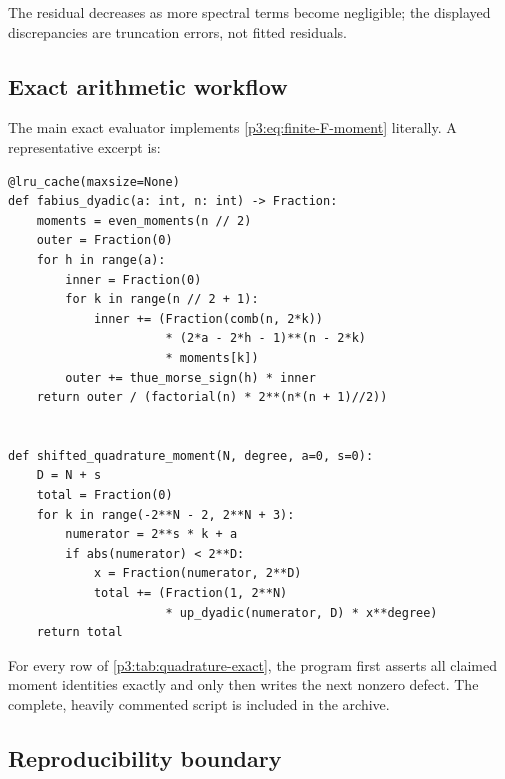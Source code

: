 \documentclass[11pt,oneside]{article}
\numberwithin{equation}{section}
\theoremstyle{definition}
\theoremstyle{remark}
\begin{document}
\begin{table}[H]
\centering
\caption{Independent exact-versus-spectral verification at $\theta=1/8$.  The first numerical column is obtained from exact rational arithmetic and displayed decimally; the full fractions are retained in the archive.}
\label{p3:tab:spectral-check}

\end{table}

The residual decreases as more spectral terms become negligible; the displayed discrepancies are truncation errors, not fitted residuals.

\subsection{Exact arithmetic workflow}

The main exact evaluator implements \eqref{p3:eq:finite-F-moment} literally.  A representative excerpt is:

\begin{lstlisting}[style=frontiercode,caption={Exact dyadic Fabius evaluation and shifted moment quadrature.}]
@lru_cache(maxsize=None)
def fabius_dyadic(a: int, n: int) -> Fraction:
    moments = even_moments(n // 2)
    outer = Fraction(0)
    for h in range(a):
        inner = Fraction(0)
        for k in range(n // 2 + 1):
            inner += (Fraction(comb(n, 2*k))
                      * (2*a - 2*h - 1)**(n - 2*k)
                      * moments[k])
        outer += thue_morse_sign(h) * inner
    return outer / (factorial(n) * 2**(n*(n + 1)//2))


def shifted_quadrature_moment(N, degree, a=0, s=0):
    D = N + s
    total = Fraction(0)
    for k in range(-2**N - 2, 2**N + 3):
        numerator = 2**s * k + a
        if abs(numerator) < 2**D:
            x = Fraction(numerator, 2**D)
            total += (Fraction(1, 2**N)
                      * up_dyadic(numerator, D) * x**degree)
    return total
\end{lstlisting}

For every row of \cref{p3:tab:quadrature-exact}, the program first asserts all claimed moment identities exactly and only then writes the next nonzero defect.  The complete, heavily commented script is included in the archive.

\subsection{Reproducibility boundary}
\end{document}
